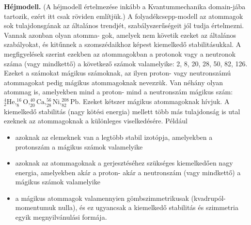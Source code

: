 \documentclass[../main.tex]{subfiles}
\begin{document}
\textbf{Héjmodell.} (A héjmodell értelmezése inkább a Kvantummechanika domain-jába tartozik, ezért itt csak röviden említjük.) 
A folyadékcsepp-modell az atommagok sok tulajdonsgának az általános trendjét, szabályszerűségeit jól tudja értelmezni. Vannak azonban olyan atomma-
gok, amelyek nem követik ezeket az általános szabályokat, és kitűnnek a szomszédaikhoz
képest kiemelkedő stabilitásukkal. A megfigyelések szerint ezekben az atommagokban
a protonok vagy a neutronok száma (vagy mindkettő) a következő számok valamelyike:
2, 8, 20, 28, 50, 82, 126. Ezeket a számokat mágikus számoknak, az ilyen proton- vagy
neutronszámú atommagokat pedig mágikus atommagoknak nevezzük. Van néhány olyan
atommag is, amelyekben mind a proton- mind a neutronszám mágikus szám: $^4_2\mathrm{He}, ^{16}_8\mathrm{O},
^{40}_{20}\mathrm{Ca}, ^{56}_{28}\mathrm{Ni}, ^{208}_{82} \mathrm{Pb}$. Ezeket kétszer mágikus atommagoknak hívjuk.
A kiemelkedő stabilitás (nagy kötési energia) mellett több más tulajdonság is utal
ezeknek az atommagoknak a különleges viselkedésére. Például
\begin{itemize}
    \item azoknak az elemeknek van a legtöbb stabil izotópja, amelyekben a protonszám a mágikus számok valamelyike
    \item azoknak az atommagoknak a gerjesztéséhez szükséges kiemelkedően nagy energia, amelyekben akár a proton- akár a neutronszám (vagy mindkettő) a mágikus számok valamelyike
    \item a mágikus atommagok valamennyien gömbszimmetrikusak (kvadrupól-momentumuk nulla), és ez ugyancsak a kiemelkedő stabilitás és szimmetria egyik megnyilvánulási formája.
\end{itemize}
\end{document}
